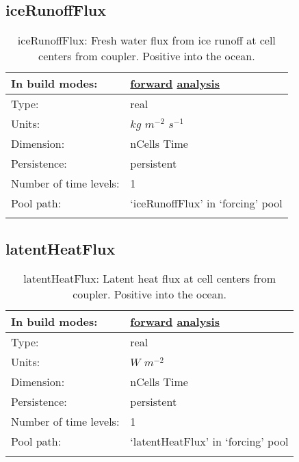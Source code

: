 \subsection[iceRunoffFlux]{iceRunoffFlux}
\label{subsec:var_sec_forcing_iceRunoffFlux}
\begin{center}
\begin{longtable}{| p{2.0in} | p{4.0in} |}
        \hline 
        In build modes: & \hyperref[subsec:forward_var_tab_forcing]{forward} \hyperref[subsec:analysis_var_tab_forcing]{analysis} \\
        \hline 
        Type: & real \\
        \hline 
        Units: & $kg$ $m^{-2}$ $s^{-1}$ \\
        \hline 
        Dimension: & nCells Time \\
        \hline 
        Persistence: & persistent \\
        \hline 
        Number of time levels: & 1 \\
        \hline 
            Pool path: & `iceRunoffFlux' in `forcing' pool \\
		 \hline 
    \caption{iceRunoffFlux: Fresh water flux from ice runoff at cell centers from coupler. Positive into the ocean.}
\end{longtable}
\end{center}
\subsection[latentHeatFlux]{latentHeatFlux}
\label{subsec:var_sec_forcing_latentHeatFlux}
\begin{center}
\begin{longtable}{| p{2.0in} | p{4.0in} |}
        \hline 
        In build modes: & \hyperref[subsec:forward_var_tab_forcing]{forward} \hyperref[subsec:analysis_var_tab_forcing]{analysis} \\
        \hline 
        Type: & real \\
        \hline 
        Units: & $W$ $m^{-2}$ \\
        \hline 
        Dimension: & nCells Time \\
        \hline 
        Persistence: & persistent \\
        \hline 
        Number of time levels: & 1 \\
        \hline 
            Pool path: & `latentHeatFlux' in `forcing' pool \\
		 \hline 
    \caption{latentHeatFlux: Latent heat flux at cell centers from coupler. Positive into the ocean.}
\end{longtable}
\end{center}

